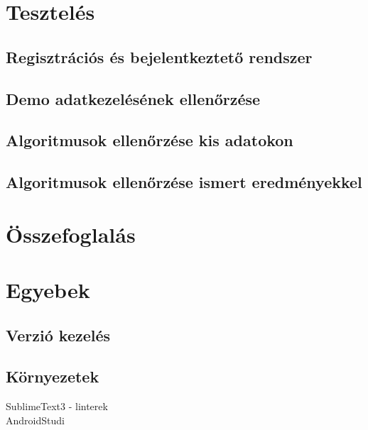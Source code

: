 \documentclass[12pt]{report}
\newtheorem{tét}{Tétel}[chapter]
\theoremstyle{definition}
\begin{document}
\chapter{Tesztelés}
\section{Regisztrációs és bejelentkeztető rendszer}
\section{Demo adatkezelésének ellenőrzése}
\section{Algoritmusok ellenőrzése kis adatokon}
\section{Algoritmusok ellenőrzése ismert eredményekkel}

\chapter{Összefoglalás}

\chapter{Egyebek}
\section{Verzió kezelés}

\section{Környezetek}
SublimeText3 - linterek\\

AndroidStudi


%
\end{document}
